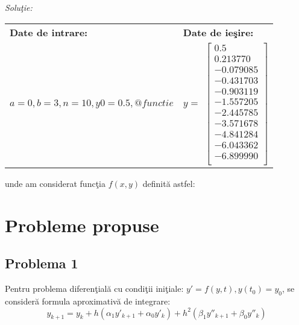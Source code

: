 \documentclass{exam}
\newcommand{\octavescript}[2]{
	
}
\begin{document}
\textit{Soluţie:}

\octavescript{./src/pred_corector3.m}{Metoda predictor-corector.}

\begin{center}
	\begin{tabular}{| l | l |}
		\hline
		\textbf{Date de intrare:}                   & \textbf{Date de ieşire:} \\
		$a = 0, b = 3, n = 10, y0 = 0.5,  @functie$ &
		$y = $
		$
			\begin{bmatrix}
				0.5       \\
				0.213770  \\
				-0.079085 \\
				-0.431703 \\
				-0.903119 \\
				-1.557205 \\
				-2.445785 \\
				-3.571678 \\
				-4.841284 \\
				-6.043362 \\
				-6.899990 \\
			\end{bmatrix}
		$
		\\
		\hline
	\end{tabular}
\end{center}

\noindent unde am considerat funcţia $f(x,y)$ definită astfel:
\octavescript{./src/functie.m}{Exemplu de funcţie de integrat.}



\section{Probleme propuse}

\subsection{Problema 1}

Pentru problema diferenţială cu condiţii iniţiale: $y{'} = f(y, t), y(t_{0}) = y_{0}$, se consideră formula aproximativă de integrare:
$$y_{k+1} = y_{k} + h (\alpha_{1} y'_{k+1} + \alpha_{0} y'_{k}) + h^{2}(\beta_{1}y''_{k+1} + \beta_{0}y''_{k})$$
\end{document}
